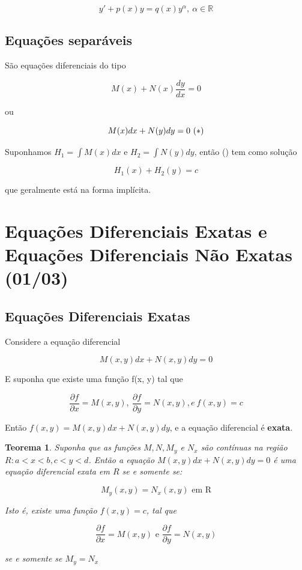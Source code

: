 \documentclass[12pt]{article}
\newtheorem{theorem}{Teorema}[section]
\begin{document}
$$y' + p(x) y = q(x) y^\alpha, \ \alpha \in \mathbb{R}$$

\subsection*{Equações separáveis}

São equações diferenciais do tipo

$$M(x) + N(x) \dfrac{d y}{d x} = 0$$

ou

$$M(x) d x + N(y) d y = 0 \  (\text{\textasteriskcentered})$$

Suponhamos $H_1 = \int M(x) d x$ e $H_2 = \int N(y) d y$, então (\textasteriskcentered) tem como solução

$$H_1(x) + H_2 (y) = c$$

que geralmente está na forma implícita.

\section{Equações Diferenciais Exatas e Equações Diferenciais Não Exatas (01/03)}
\subsection*{Equações Diferenciais Exatas}
Considere a equação diferencial

$$M(x, y) d x + N(x, y) d y = 0$$

E suponha que existe uma função f(x, y) tal que 

$$\dfrac{\partial f}{\partial x} = M(x,y), \ \dfrac{\partial f}{\partial y} = N(x, y), e \ f(x, y) = c$$

Então $f(x, y) = M(x, y) d x + N(x, y) d y$, e a equação diferencial é \textbf{exata}.

\begin{theorem}
Suponha que as funções $M, N, M_y$ e $N_x$ são contínuas na região $R: a<x<b, c<y<d$. Então a equação $M(x, y) d x + N(x, y) d y = 0$ é uma equação diferencial exata em $R$ se e somente se:

$$M_y(x, y) = N_x(x, y) \text{ em R}$$

Isto é, existe uma função $f(x, y) = c$, tal que

$$\dfrac{\partial f}{\partial x} = M(x,y) \text{ e } \dfrac{\partial f}{\partial y} = N(x, y)$$

se e somente se $M_y = N_x$
\end{theorem}
\end{document}
